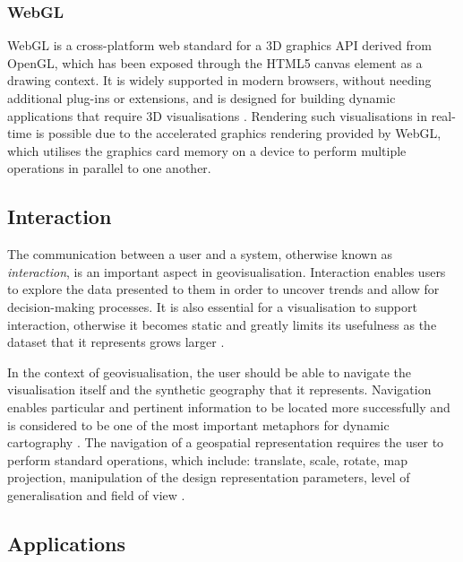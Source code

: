 \documentclass[
	fontsize=11pt
	headlines=2,
	footlines=2,
	parskip=half
]{scrartcl}
\begin{document}
{{{			}

			\subsubsection{WebGL} {

				WebGL is a cross-platform web standard for a 3D graphics API derived from OpenGL, which has been exposed through the HTML5 canvas element \parencite{marrin2011webgl} as a drawing context. It is widely supported in modern browsers, without needing additional plug-ins or extensions, and is designed for building dynamic applications that require 3D visualisations \parencite{chaturvedi2015web, marrin2011webgl, parisi2012webgl}. Rendering such visualisations in real-time is possible due to the accelerated graphics rendering provided by WebGL, which utilises the graphics card memory on a device \parencite{chaturvedi2015web} to perform multiple operations in parallel to one another.

			}

		}

		\subsection{Interaction} {

			The communication between a user and a system, otherwise known as \emph{interaction}, is an important aspect in geovisualisation. Interaction enables users to explore the data presented to them in order to uncover trends and allow for decision-making processes. It is also essential for a visualisation to support interaction, otherwise it becomes static and greatly limits its usefulness as the dataset that it represents grows larger \parencite{yi2007toward}.

			In the context of geovisualisation, the user should be able to navigate the visualisation itself and the synthetic geography that it represents. Navigation enables particular and pertinent information to be located more successfully and is considered to be one of the most important metaphors for dynamic cartography \parencite{cartwright2001geospatial}. The navigation of a geospatial representation requires the user to perform standard operations, which include: translate, scale, rotate, map projection, manipulation of the design representation parameters, level of generalisation and field of view \parencite{cartwright2001geospatial, hand1997survey}.

		}

		\subsection{Applications} {

}}
\end{document}
